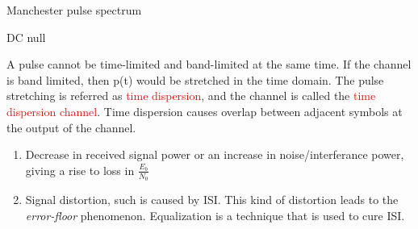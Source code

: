 \documentclass[a4paper,11pt]{article}
\begin{document}
\begin{notederivation}[mode=steps]{Manchester pulse spectrum}

\end{notederivation}


\begin{notederivation}[mode=steps]{DC null}
\end{notederivation}


A pulse cannot be time-limited and band-limited at the same time. If the channel is band limited, then p(t) would be stretched in the time domain. The pulse stretching is referred as \textcolor{red}{time dispersion}, and the channel is called the \textcolor{red}{time dispersion channel}. Time dispersion causes overlap between adjacent symbols at the output of the channel.

\begin{enumerate}
    \item Decrease in received signal power or an increase in noise/interferance power, giving a rise to loss in $\frac{E_{b}}{N_{0}}$
    \item Signal distortion, such is caused by ISI. This kind of distortion leads to the \textit{error-floor} phenomenon. Equalization is a technique that is used to cure ISI.
\end{enumerate}
\end{document}
